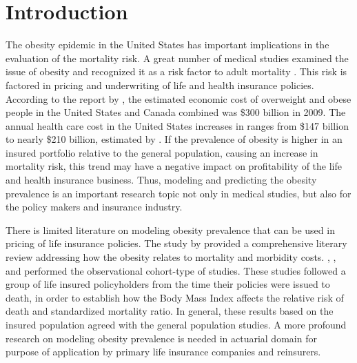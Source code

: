 \documentclass[11pt,letterpaper]{article}
\numberwithin{equation}{section}
\begin{document}
\section{Introduction}\label{sec:introduction}
The obesity epidemic in the United States has important implications in the evaluation of the mortality risk. A great number of medical studies examined the issue of obesity and recognized it as a risk factor to adult mortality  \citep{Olshansky+Passaro+Hershow+Layden+Carnes+Brody+Hayflick+Butler+Allison+Ludwig:2005,Chatterjee+Macdonald+Waters:2008}. This risk is factored in pricing and underwriting of life and health insurance policies. According to the report by \cite{Behan+Cox+Lin+Pai+Pedersen+Yi:2010}, the estimated economic cost of overweight and obese people in the United States and Canada combined was \$300 billion in 2009. The annual health care cost in the United States increases in ranges from \$147 billion to nearly \$210 billion, estimated by \cite{Cawley+Meyerhoefer:2012}. If the prevalence of obesity is higher in an insured portfolio relative to the general population, causing an increase in mortality risk, this trend may have a negative impact on profitability of the life and health insurance business. Thus, modeling and predicting the obesity prevalence is an important research topic not only in medical studies, but also for the policy makers and insurance industry.

There is limited literature on modeling obesity prevalence that can be used in pricing of life insurance policies. The study by \cite{Behan+Cox+Lin+Pai+Pedersen+Yi:2010} provided a comprehensive literary review addressing how the obesity relates to mortality and morbidity costs. \cite{Niverthi+Ianovic:2001}, \cite{Baldinger+Schwarz+Jaggy:2006}, and \cite{BradRoudebush+Ashley+Titcomb:2006} performed the observational cohort-type of studies. These studies followed a group of life insured policyholders from the time their policies were issued to death, in order to establish how the Body Mass Index affects the relative risk of death and standardized mortality ratio. In general, these results based on the insured population agreed with the general population studies. A more profound research on modeling obesity prevalence is needed in actuarial domain for purpose of application by primary life insurance companies and reinsurers.
\end{document}
